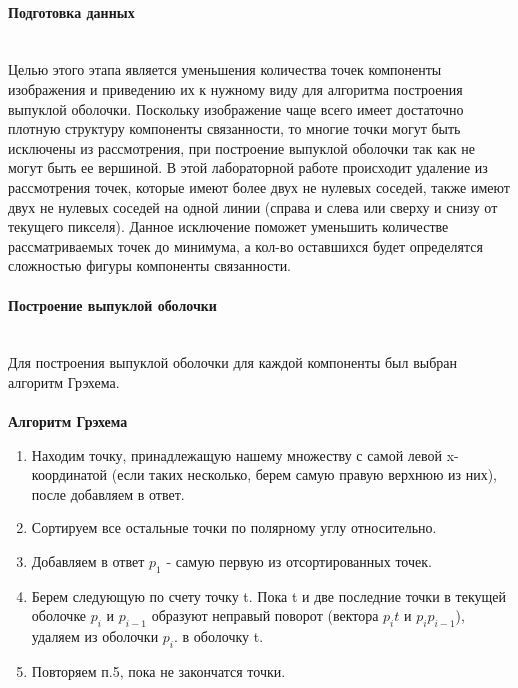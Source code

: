 \documentclass{report}
\begin{document}
\paragraph{Подготовка данных\\\\}
\par Целью этого этапа является уменьшения количества точек компоненты изображения и приведению их к нужному виду для алгоритма построения выпуклой оболочки. Поскольку изображение чаще всего имеет достаточно плотную структуру компоненты связанности, то многие точки могут быть исключены из рассмотрения, при построение выпуклой оболочки так как не могут быть ее вершиной. В этой лабораторной работе происходит удаление из рассмотрения точек, которые имеют более двух не нулевых соседей, также имеют двух не нулевых соседей на одной линии (справа и слева или сверху и снизу от текущего пикселя). Данное исключение поможет уменьшить количестве рассматриваемых точек до минимума, а кол-во оставшихся будет определятся сложностью фигуры компоненты связанности.
\paragraph{Построение выпуклой оболочки\\\\}
\par Для построения выпуклой оболочки для каждой компоненты был выбран алгоритм Грэхема. \\\\
\textbf{Алгоритм Грэхема}
\begin{enumerate}
  \item Находим точку, принадлежащую нашему множеству с самой левой x-координатой (если таких несколько, берем самую правую верхнюю из них), после добавляем в ответ.
  \item Сортируем все остальные точки по полярному углу относительно.
  \item Добавляем в ответ $p_1$ - самую первую из отсортированных точек. 
  \item Берем следующую по счету точку t. Пока t и две последние точки в текущей оболочке $p_i$ и $p_{i-1}$ образуют неправый поворот (вектора $p_i$$t$ и $p_i$$p_{i-1}$), удаляем из оболочки $p_i$. 
   в оболочку t. 
  \item Повторяем п.5, пока не закончатся точки.
\end{enumerate}
\newpage

\end{document}
